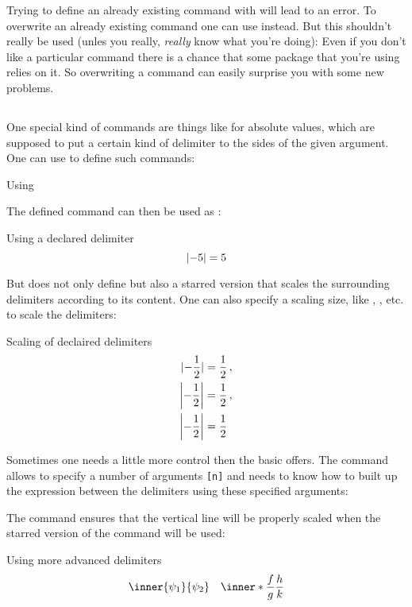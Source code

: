 Trying to define an already existing command with  will lead to an error.
To overwrite an already existing command one can use  instead.
But this shouldn’t really be used (unles you really, \emph{really} know what you’re doing):
Even if you don’t like a particular command there is a chance that some package that you’re using relies on it.
So overwriting a command can easily surprise you with some new problems.



\subsection{}

One special kind of commands are things like  for absolute values, which are supposed to put a certain kind of delimiter to the sides of the given argument.
One can use  to define such commands:
\begin{showcode}{Using }
\DeclarePairedDelimiter{\abs}{\lvert}{\rvert}
\end{showcode}
The defined command can then be used as :
\begin{showlatex}{Using a declared delimiter}
  \[
    \abs{-5} = 5
  \]
\end{showlatex}

But  does not only define  but also a starred version  that scales the surrounding delimiters according to its content.
One can also specify a scaling size, like , , etc. to scale the delimiters:
\begin{showlatex}{Scaling of declaired delimiters}
\begin{align*}
  \abs{-\frac{1}{2}}
  &=
  \frac{1}{2} \,,
  \\
  \abs*{-\frac{1}{2}}
  &=
  \frac{1}{2} \,,
  \\
  \abs[\bigg]{-\frac{1}{2}}
  &=
  \frac{1}{2}
\end{align*}
\end{showlatex}

Sometimes one needs a little more control then the basic  offers.
The command  allows to specify a number of arguments \texttt{[n]} and needs to know how to built up the expression between the delimiters using these specified arguments:
The command  ensures that the vertical line  will be properly scaled when the starred version of the command will be used:
\begin{showlatex}{Using more advanced delimiters}
\[
  \inner{\psi_1}{\psi_2}
  \quad
  \inner*{\frac{f}{g}}{\frac{h}{k}}
\]
\end{showlatex}

